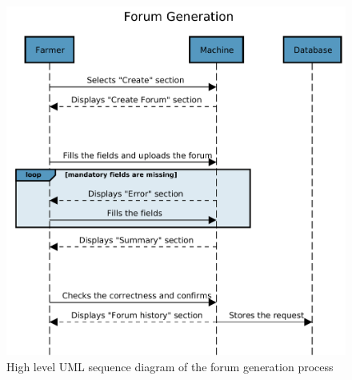 \begin{figure}[H]
	\centering
    \includegraphics[page=1, width=\textwidth]{Images/SeqDiag/forum_generation_seq_diag.pdf}
	\caption{\label{fig:forum_generation_seq_diag}High level UML sequence diagram of the forum generation process}
\end{figure}



